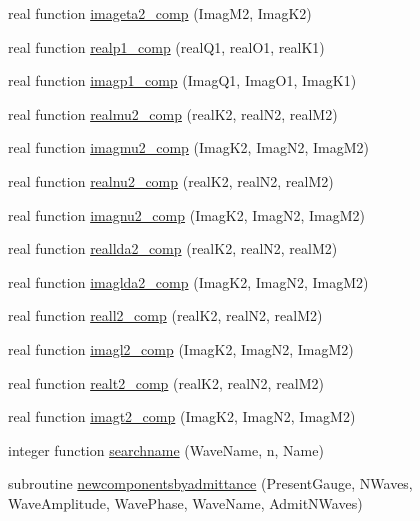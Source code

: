 \begin{DoxyCompactItemize}
real function \mbox{\hyperlink{namespacemodulegauge_a86cfe6d4e8801b4ade2414988f7586a7}{imageta2\+\_\+comp}} (Imag\+M2, Imag\+K2)
\item 
real function \mbox{\hyperlink{namespacemodulegauge_a063b6192aa0376262853a2161d0f21da}{realp1\+\_\+comp}} (real\+Q1, real\+O1, real\+K1)
\item 
real function \mbox{\hyperlink{namespacemodulegauge_a45d6d9badd92c973e90b945525d4c23e}{imagp1\+\_\+comp}} (Imag\+Q1, Imag\+O1, Imag\+K1)
\item 
real function \mbox{\hyperlink{namespacemodulegauge_aba58a8476e1ed7afa1d32b6ec5119be3}{realmu2\+\_\+comp}} (real\+K2, real\+N2, real\+M2)
\item 
real function \mbox{\hyperlink{namespacemodulegauge_acb26f834d34705945913d60c75c3ce71}{imagmu2\+\_\+comp}} (Imag\+K2, Imag\+N2, Imag\+M2)
\item 
real function \mbox{\hyperlink{namespacemodulegauge_a3fe2f51cb87bda2360ce6930edea74fd}{realnu2\+\_\+comp}} (real\+K2, real\+N2, real\+M2)
\item 
real function \mbox{\hyperlink{namespacemodulegauge_a63b14124c79ff7d860721610832a3ef5}{imagnu2\+\_\+comp}} (Imag\+K2, Imag\+N2, Imag\+M2)
\item 
real function \mbox{\hyperlink{namespacemodulegauge_aa12106b28d4813b546feb45a0408ffa0}{reallda2\+\_\+comp}} (real\+K2, real\+N2, real\+M2)
\item 
real function \mbox{\hyperlink{namespacemodulegauge_a0f06a83482f5b7e22cfbc40e9f7e89f4}{imaglda2\+\_\+comp}} (Imag\+K2, Imag\+N2, Imag\+M2)
\item 
real function \mbox{\hyperlink{namespacemodulegauge_ae24e18d5af2b616f42c314149246cef5}{reall2\+\_\+comp}} (real\+K2, real\+N2, real\+M2)
\item 
real function \mbox{\hyperlink{namespacemodulegauge_aed10e532f405cfa750b753e960e5a8dc}{imagl2\+\_\+comp}} (Imag\+K2, Imag\+N2, Imag\+M2)
\item 
real function \mbox{\hyperlink{namespacemodulegauge_a5708a7eceb753eedf87d41d40a3a619a}{realt2\+\_\+comp}} (real\+K2, real\+N2, real\+M2)
\item 
real function \mbox{\hyperlink{namespacemodulegauge_a2dcd9bdfab5c9c98762f6cc509efd8ae}{imagt2\+\_\+comp}} (Imag\+K2, Imag\+N2, Imag\+M2)
\item 
integer function \mbox{\hyperlink{namespacemodulegauge_ab1a6acb6664eeba72c5a5d3487c6b4e6}{searchname}} (Wave\+Name, n, Name)
\item 
subroutine \mbox{\hyperlink{namespacemodulegauge_a595eb00804040bb46c4684d46b5ed2eb}{newcomponentsbyadmittance}} (Present\+Gauge, N\+Waves, Wave\+Amplitude, Wave\+Phase, Wave\+Name, Admit\+N\+Waves)

\end{DoxyCompactItemize}
